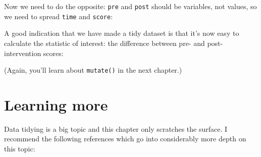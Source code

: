 Now we need to do the opposite: \texttt{pre} and \texttt{post} should be
variables, not values, so we need to spread \texttt{time} and
\texttt{score}:

\begin{Shaded}
\begin{Highlighting}[]
\StringTok{ }
\CommentTok{#> }
\end{Highlighting}
\end{Shaded}

A good indication that we have made a tidy dataset is that it's now easy
to calculate the statistic of interest: the difference between pre- and
post-intervention scores:

\begin{Shaded}
\begin{Highlighting}[]
 \StringTok{ }
\CommentTok{#> }
\end{Highlighting}
\end{Shaded}

(Again, you'll learn about \texttt{mutate()} in the next chapter.)

\section{Learning more}

Data tidying is a big topic and this chapter only scratches the surface.
I recommend the following references which go into considerably more
depth on this topic:

